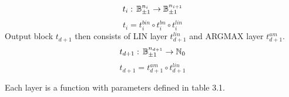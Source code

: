 \documentclass{fithesis}
\begin{document}
\begin{equation*}
    t_i: \, \mathbb{B}_{\pm 1}^{n_i} \to \mathbb{B}_{\pm 1}^{n_{i+1}}
\end{equation*}
\begin{equation}
    t_i = t_i^{bin} \circ t_i^{bn} \circ t_i^{lin}
\end{equation}
Output block $t_{d+1}$ then consists of LIN layer $t_{d+1}^{lin}$ and ARGMAX layer
$t_{d+1}^{am}$.
\begin{equation*}
    t_{d+1}: \, \mathbb{B}_{\pm 1}^{n_{d+1}} \to \mathbb{N}_0
\end{equation*}
\begin{equation}
    t_{d+1} = t_{d+1}^{am} \circ t_{d+1}^{lin}
\end{equation}

Each layer is a function with parameters defined in table 3.1.
\end{document}
